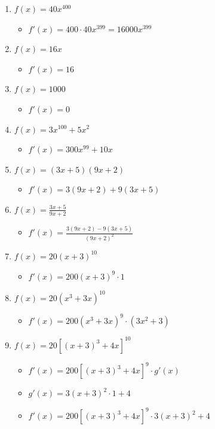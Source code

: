 \begin{enumerate}
    \item $f(x) = 40x^{400}$
    \begin{itemize}
        \item $f'(x) = 400\cdot40x^{399} = 16000x^{399}$
    \end{itemize}
    \item $f(x) = 16x$
    \begin{itemize}
        \item $f'(x) = 16$
    \end{itemize}
    \item $f(x) = 1000$ 
    \begin{itemize}
        \item $f'(x) = 0$
    \end{itemize}
    \item $f(x) = 3x^{100} + 5x^2$
    \begin{itemize}
        \item $f'(x) = 300x^{99} + 10x$
    \end{itemize}
    \item $f(x) = (3x + 5)(9x + 2)$
    \begin{itemize}
        \item $f'(x) = 3(9x + 2) + 9(3x + 5)$
    \end{itemize}
    \item $f(x) = \frac{3x + 5}{9x + 2}$
    \begin{itemize}
        \item $f'(x) = \frac{3(9x + 2) - 9(3x + 5)}{(9x + 2)^2}$
    \end{itemize}
    \item $f(x) = 20(x + 3)^{10}$
    \begin{itemize}
        \item $f'(x) = 200(x + 3)^9 \cdot 1$
    \end{itemize}
    \item $f(x) = 20(x^3 + 3x)^{10}$
    \begin{itemize}
        \item $f'(x) = 200(x^3 + 3x)^9 \cdot (3x^2 + 3)$
    \end{itemize}
    \item $f(x) = 20[(x + 3)^3 + 4x]^{10}$
    \begin{itemize}
        \item $f'(x) = 200[(x + 3)^3 + 4x]^9 \cdot g'(x)$
        \item $g'(x) = 3(x + 3)^2 \cdot 1 +  4$
        \item $f'(x) = 200[(x + 3)^3 + 4x]^9 \cdot 3(x + 3)^2 + 4$

\end{itemize}
\end{enumerate}
